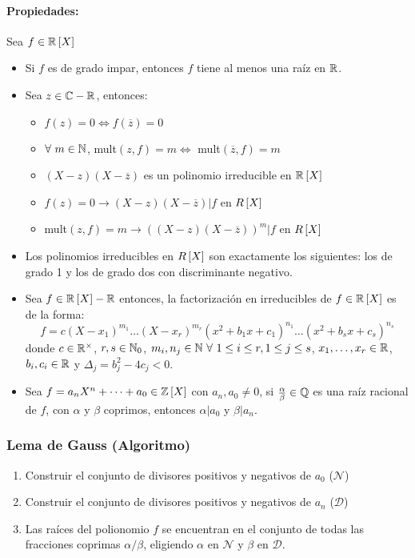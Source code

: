 \paragraph{Propiedades:}Sea $f\in\mathbb{R}\left[X\right]$
\begin{itemize}
    \item Si $f$ es de grado impar, entonces $f$ tiene al menos una raíz en $\mathbb{R}$. 
    \item Sea $z\in\mathbb{C}-\mathbb{R}$, entonces:
    \begin{itemize}
        \item $f(z) = 0\iff f(\overline{z}) = 0$
        \item $\forall~m\in\mathbb{N}$, mult$(z,f) =  m \iff$ mult$(\overline{z},f) = m$
        \item $(X-z)(X-\overline{z})$ es un polinomio irreducible en $\mathbb{R}\left[X\right]$
        \item $f(z)=0 \to (X-z)(X-\overline{z})|f$ en $R\left[X\right]$
        \item mult$(z,f) = m \to ((X-z)(X-\overline{z}))^m|f$ en $R\left[X\right]$
    \end{itemize}
    \item Los polinomios irreducibles en $R\left[X\right]$ son exactamente los siguientes: los de grado 1 y los de grado dos con discriminante negativo.
    \item Sea $f\in\mathbb{R}\left[X\right]-\mathbb{R}$ entonces, la factorización en irreducibles de $f\in\mathbb{R}\left[X\right]$ es de la forma:
    \begin{equation*}
        f = c(X-x_1)^{m_1}\dots(X-x_r)^{m_r}(x^2 + b_1x + c_1)^{n_1}\dots(x^2 + b_sx + c_s)^{n_s}
    \end{equation*}
    donde $c\in\mathbb{R}^\times$, $r,s\in\mathbb{N}_0$, $m_i,n_j\in\mathbb{N}~\forall~1\leq i\leq r, 1\leq j\leq s$, $x_1,\dots,x_r\in\mathbb{R}$, $b_i,c_i\in\mathbb{R}$ y $\Delta_j = b_j^2 - 4c_j < 0$.
    \item Sea $f=a_nX^n + \dots + a_0\in\mathbb{Z}\left[X\right]$ con $a_n,a_0\neq0$, si $\frac{\alpha}{\beta}\in\mathbb{Q}$ es una raíz racional de $f$, con $\alpha$ y $\beta$ coprimos, entonces $\alpha|a_0$ y $\beta|a_n$.
\end{itemize}

\subsubsection{Lema de Gauss (Algoritmo)}
\begin{enumerate}
    \item Construir el conjunto de divisores positivos y negativos de $a_0$ ($\mathcal{N}$)
    \item Construir el conjunto de divisores positivos y negativos de $a_n$ ($\mathcal{D}$)
    \item Las raíces del polionomio $f$ se encuentran en el conjunto de todas las fracciones coprimas $\alpha/\beta$, eligiendo $\alpha$ en $\mathcal{N}$ y $\beta$ en $\mathcal{D}$.
\end{enumerate}

